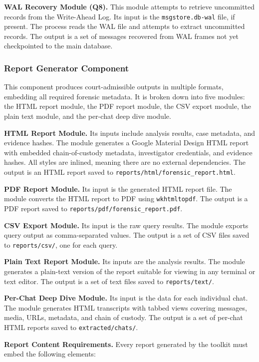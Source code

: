 \documentclass[12pt,a4paper]{report}
\begin{document}
\textbf{WAL Recovery Module (Q8).} This module attempts to retrieve uncommitted records from the Write-Ahead Log. Its input is the \texttt{msgstore.db-wal} file, if present. The process reads the WAL file and attempts to extract uncommitted records. The output is a set of messages recovered from WAL frames not yet checkpointed to the main database.

\subsubsection{Report Generator Component}

This component produces court-admissible outputs in multiple formats, embedding all required forensic metadata. It is broken down into five modules: the HTML report module, the PDF report module, the CSV export module, the plain text module, and the per-chat deep dive module.

\textbf{HTML Report Module.} Its inputs include analysis results, case metadata, and evidence hashes. The module generates a Google Material Design HTML report with embedded chain-of-custody metadata, investigator credentials, and evidence hashes. All styles are inlined, meaning there are no external dependencies. The output is an HTML report saved to \texttt{reports/html/forensic\_report.html}.

\textbf{PDF Report Module.} Its input is the generated HTML report file. The module converts the HTML report to PDF using \texttt{wkhtmltopdf}. The output is a PDF report saved to \texttt{reports/pdf/forensic\_report.pdf}.

\textbf{CSV Export Module.} Its input is the raw query results. The module exports query output as comma-separated values. The output is a set of CSV files saved to \texttt{reports/csv/}, one for each query.

\textbf{Plain Text Report Module.} Its inputs are the analysis results. The module generates a plain-text version of the report suitable for viewing in any terminal or text editor. The output is a set of text files saved to \texttt{reports/text/}.

\textbf{Per-Chat Deep Dive Module.} Its input is the data for each individual chat. The module generates HTML transcripts with tabbed views covering messages, media, URLs, metadata, and chain of custody. The output is a set of per-chat HTML reports saved to \texttt{extracted/chats/}.

\textbf{Report Content Requirements.} Every report generated by the toolkit must embed the following elements:
\end{document}

